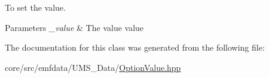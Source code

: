 To set the value. 


\begin{DoxyParams}{Parameters}
{\em \_\-value} & The value value \\
\hline
\end{DoxyParams}


The documentation for this class was generated from the following file:\begin{DoxyCompactItemize}
\item 
core/src/emfdata/UMS\_\-Data/\hyperlink{OptionValue_8hpp}{OptionValue.hpp}\end{DoxyCompactItemize}

